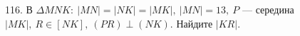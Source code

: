 116. В $\Delta MNK:\ |MN|=|NK|=|MK|,\ |MN|=13,\ P$ --- середина $|MK|,\ R\in[NK],\ (PR)\perp(NK).$ Найдите $|KR|.$\\
